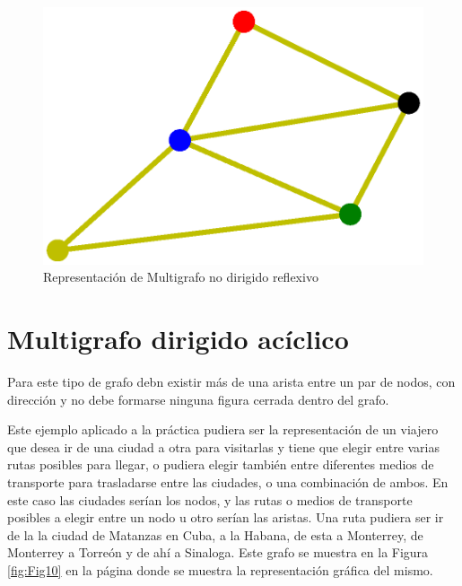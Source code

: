 \documentclass{article}
\begin{document}
\begin{figure}
    \centering
    \includegraphics[scale=0.6]{imagenes/Fig09.eps}
    \caption{Representación de Multigrafo no dirigido reflexivo}
    \label{fig:Fig09}
\end{figure}

\section{Multigrafo dirigido acíclico}

Para este tipo de grafo debn existir más de una arista entre un par de nodos, con dirección y no debe formarse ninguna figura cerrada dentro del grafo. 

Este ejemplo aplicado a la práctica pudiera ser la representación de un viajero que desea ir de una ciudad a otra para visitarlas y tiene que elegir entre varias rutas posibles para llegar, o pudiera elegir también entre diferentes medios de transporte para trasladarse entre las ciudades, o una combinación de ambos. En este caso las ciudades serían los nodos, y las rutas o medios de transporte posibles a elegir entre un nodo u otro serían las aristas. Una ruta pudiera ser ir de la la ciudad de Matanzas en Cuba, a la Habana, de esta a Monterrey, de Monterrey a Torreón y de ahí a Sinaloga. Este grafo se muestra en la Figura \ref{fig:Fig10} en la página \pageref{fig:Fig10} donde se muestra la representación gráfica del mismo. 


\end{document}
